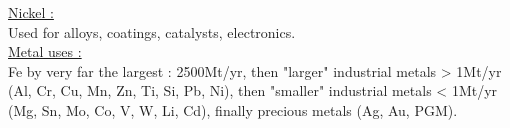 \documentclass[../main.tex]{subfiles}
\begin{document}
\quad \underline{Nickel :}\\
Used for alloys, coatings, catalysts, electronics.\\

\quad \underline{Metal uses :}\\
Fe by very far the largest : 2500Mt/yr, then "larger" industrial metals > 1Mt/yr (Al, Cr, Cu, Mn, Zn, Ti, Si, Pb, Ni), then "smaller" industrial metals < 1Mt/yr (Mg, Sn, Mo, Co, V, W, Li, Cd), finally precious metals (Ag, Au, PGM).\\
\end{document}
